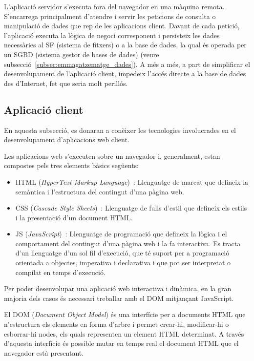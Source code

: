 \documentclass[a4paper,12pt]{ThesisStyle}
\begin{document}
L'aplicació servidor s'executa fora del navegador en una màquina remota. S'encarrega principalment d'atendre i servir les peticions de consulta o manipulació de dades que rep de les aplicacions client. Davant de cada petició, l'aplicació executa la lògica de negoci corresponent i persisteix les dades necessàries al SF (sistema de fitxers) o a la base de dades, la qual és operada per un SGBD (sistema gestor de bases de dades) (veure subsecció~\ref{subsec:emmagatzematge_dades}). A més a més, a part de simplificar el desenvolupament de l'aplicació client, impedeix l'accés directe a la base de dades des d'Internet, fet que seria molt perillós.

\subsection{Aplicació client}
\label{subsec:aplicacio_client}

En aquesta subsecció, es donaran a conèixer les tecnologies involucrades en el desenvolupament d'aplicacions web client.

Les aplicacions web s'executen sobre un navegador i, generalment, estan compostes pels tres elements bàsics següents:
\begin{itemize}
  \item HTML (\textit{HyperText Markup Language})~\cite{HTML}: Llenguatge de marcat que defineix la semàntica i l'estructura del contingut d'una pàgina web.
  \item CSS (\textit{Cascade Style Sheets})~\cite{CSS}: Llenguatge de fulls d'estil que defineix els estils i la presentació d'un document HTML.
  \item JS (\textit{JavaScript})~\cite{JS}: Llenguatge de programació que defineix la lògica i el comportament del contingut d'una pàgina web i la fa interactiva. Es tracta d'un llenguatge d'un sol fil d'execució, que té suport per a programació orientada a objectes, imperativa i declarativa i que pot ser interpretat o compilat en temps d'execució.
\end{itemize}

Per poder desenvolupar una aplicació web interactiva i dinàmica, en la gran majoria dels casos és necessari treballar amb el DOM mitjançant JavaScript.

El DOM (\textit{Document Object Model}) és una interfície per a documents HTML que n'estructura els elements en forma d'arbre i permet crear-hi, modificar-hi o esborrar-hi nodes, els quals representen un element HTML determinat. A través d'aquesta interfície és possible mutar en temps real el document HTML que el navegador està presentant.
\end{document}
